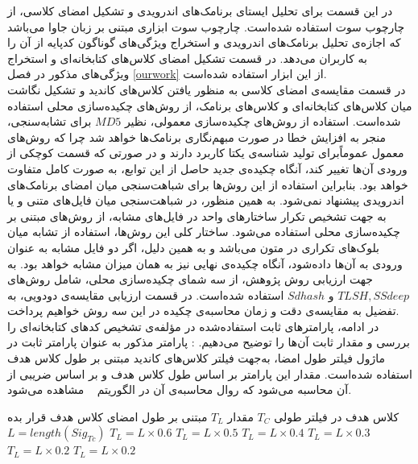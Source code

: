 در این قسمت برای تحلیل ایستا‌ی برنامک‌های اندرویدی و تشکیل امضای کلاسی، از چارچوب سوت استفاده شده‌است. چارچوب سوت ابزاری‌ مبتنی بر زبان جاوا می‌باشد که اجازه‌ی تحلیل برنامک‌های اندرویدی و استخراج ویژگی‌های گوناگون کد‌پایه از آن را به کاربران می‌دهد. در قسمت تشکیل امضای کلاس‌های کتابخانه‌ای و استخراج ویژگی‌های مذکور در فصل
\ref{ourwork}
از این ابزار استفاده شده‌‌است.\\
در قسمت مقایسه‌‌ی امضا‌ی کلاسی به منظور یافتن کلاس‌های کاندید و تشکیل نگاشت میان کلاس‌های کتابخانه‌ای و کلاس‌ها‌ی برنامک، از روش‌‌های چکیده‌سازی محلی استفاده شده‌است. استفاده از روش‌های چکیده‌سازی معمولی، نظیر $MD5$ برای تشابه‌سنجی، منجر به افزایش خطا در صورت مبهم‌نگاری برنامک‌ها خواهد شد چرا که روش‌های معمول عموماً‌برای تولید شناسه‌ی یکتا کاربرد دارند و در صورتی که قسمت کوچکی از ورودی آن‌ها تغییر کند، آنگاه چکیده‌ی جدید حاصل از این توابع، به صورت کامل متفاوت خواهد بود. بنابراین استفاده از این روش‌ها برای شباهت‌سنجی میان امضای برنامک‌های اندرویدی پیشنهاد نمی‌شود. به همین منظور، در شباهت‌سنجی میان فایل‌های متنی و یا به جهت تشخیص تکرار ساختار‌های واحد در فایل‌های مشابه، از روش‌های مبتنی بر چکیده‌سازی محلی استفاده می‌شود. ساختار کلی این روش‌ها، استفاده از تشابه میان بلوک‌های تکراری در متون می‌باشد و به همین دلیل، اگر دو فایل مشابه به عنوان ورودی به آن‌ها داده‌شود، آنگاه چکیده‌ی نهایی نیز به همان میزان مشابه خواهد بود. به جهت ارزیابی روش پژوهش، از سه شمای چکیده‌سازی محلی، شامل روش‌های $TLSH,SSdeep$ و $Sdhash$ استفاده شده‌است. در قسمت ارزیابی مقایسه‌ی دودویی، به تفضیل به مقایسه‌ی دقت و زمان محاسبه‌ی چکیده در این سه روش خواهیم پرداخت.\\
در ادامه، پارامتر‌های ثابت استفاده‌شده در مؤلفه‌ی تشخیص کد‌های کتابخانه‌ای را بررسی و مقدار ثابت‌ آن‌ها را توضیح می‌دهیم.
: پارامتر مذکور به عنوان پارامتر ثابت در ماژول فیلتر طول امضا، به‌جهت فیلتر کلاس‌‌های کاندید مبتنی بر طول کلاس هدف استفاده شده‌است. مقدار این پارامتر بر اساس طول کلاس هدف و بر اساس ضریبی از آن محاسبه می‌شود که روال محاسبه‌ی آن در الگوریتم ~ مشاهده می‌شود.

 کلاس هدف در فیلتر طولی $T_C$
 مقدار $T_L$ مبتنی بر طول امضای کلاس هدف
 قرار بده 
$L=length(Sig_{Tc})$
$T_{L} = L \times 0.6$
$T_{L} = L \times 0.5$
$T_{L} = L \times 0.4$
$T_{L} = L \times 0.3$
$T_{L} = L \times 0.2$
$T_{L} = L \times 0.2$

